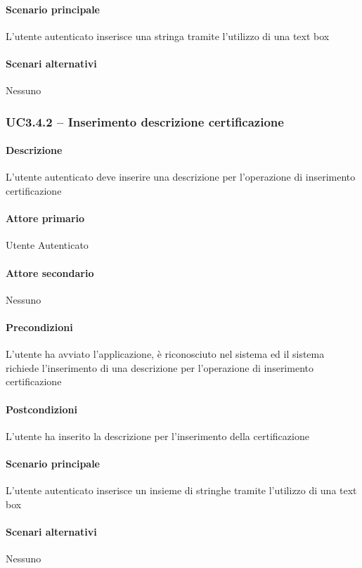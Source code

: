 \paragraph{Scenario principale}  
L’utente autenticato inserisce una stringa tramite l’utilizzo di una text box
\paragraph{Scenari alternativi}  Nessuno



\subsubsection{UC3.4.2 – Inserimento descrizione certificazione}
\paragraph{Descrizione}  L’utente autenticato deve inserire una descrizione per l’operazione di inserimento certificazione
\paragraph{Attore primario}  Utente Autenticato
\paragraph{Attore secondario}  Nessuno
\paragraph{Precondizioni} L’utente ha avviato l’applicazione, è riconosciuto nel sistema ed il sistema richiede l’inserimento di una descrizione per l’operazione di inserimento certificazione
\paragraph{Postcondizioni}  L’utente ha inserito la descrizione per l’inserimento della certificazione
\paragraph{Scenario principale}  
L’utente autenticato inserisce un insieme di stringhe tramite l’utilizzo di una text box
\paragraph{Scenari alternativi}  Nessuno




